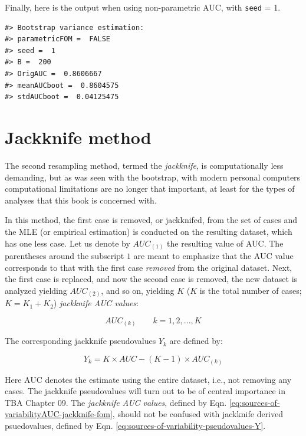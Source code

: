 \documentclass[
]{book}
\begin{document}
Finally, here is the output when using non-parametric AUC, with \texttt{seed} = 1.

\begin{verbatim}
#> Bootstrap variance estimation: 
#> parametricFOM =  FALSE 
#> seed =  1 
#> B =  200 
#> OrigAUC =  0.8606667 
#> meanAUCboot =  0.8604575 
#> stdAUCboot =  0.04125475
\end{verbatim}

\hypertarget{sources-of-variabilityJackknife}{%
\section{Jackknife method}\label{sources-of-variabilityJackknife}}

The second resampling method, termed the \emph{jackknife}, is computationally less demanding, but as was seen with the bootstrap, with modern personal computers computational limitations are no longer that important, at least for the types of analyses that this book is concerned with.

In this method, the first case is removed, or jackknifed, from the set of cases and the MLE (or empirical estimation) is conducted on the resulting dataset, which has one less case. Let us denote by \(AUC_{(1)}\) the resulting value of AUC. The parentheses around the subscript \(1\) are meant to emphasize that the AUC value corresponds to that with the first case \emph{removed} from the original dataset. Next, the first case is replaced, and now the second case is removed, the new dataset is analyzed yielding \(AUC_{(2)}\), and so on, yielding \(K\) (\(K\) is the total number of cases; \(K=K_1+K_2\)) \emph{jackknife AUC values}:

\begin{equation} 
AUC_{(k)} \qquad k=1,2,...,K
\label{eq:sources-of-variabilityAUC-jackknife-fom}
\end{equation}

The corresponding jackknife pseudovalues \(Y_k\) are defined by:

\begin{equation} 
Y_k = K\times AUC - \left ( K-1 \right ) \times AUC_{(k)}
\label{eq:sources-of-variability-pseudovalues-Y}
\end{equation}

Here AUC denotes the estimate using the entire dataset, i.e., not removing any cases. The jackknife pseudovalues will turn out to be of central importance in TBA Chapter 09. The \emph{jackknife AUC values}, defined by Eqn. \eqref{eq:sources-of-variabilityAUC-jackknife-fom}, should not be confused with jackknife derived psuedovalues, defined by Eqn. \eqref{eq:sources-of-variability-pseudovalues-Y}.
\end{document}
